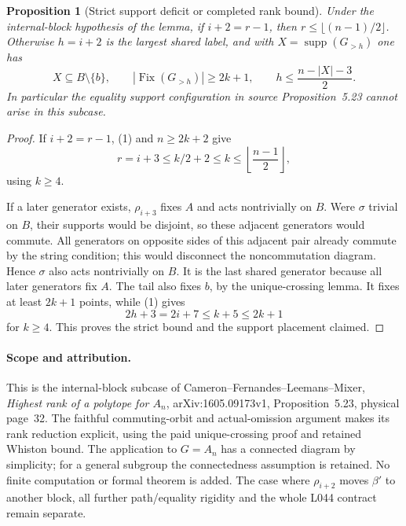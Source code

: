 \documentclass[11pt,a4paper]{article}
\newtheorem{proposition}[lemma]{Proposition}
\begin{document}
\begin{proposition}[Strict support deficit or completed rank bound]
Under the internal-block hypothesis of the lemma, if
$i+2=r-1$, then $r\leq\lfloor(n-1)/2\rfloor$.
Otherwise $h=i+2$ is the largest shared label, and with
$X=\operatorname{supp}(G_{>h})$ one has
\[
 X\subseteq B\setminus\{b\},\qquad
 |\operatorname{Fix}(G_{>h})|\geq2k+1,\qquad
 h\leq\frac{n-|X|-3}{2}.
\]
In particular the equality support configuration in source
Proposition~5.23 cannot arise in this subcase.
\end{proposition}
\begin{proof}
If $i+2=r-1$, (1) and $n\geq2k+2$ give
\[
 r=i+3\leq k/2+2\leq k\leq\left\lfloor\frac{n-1}{2}\right\rfloor,
\]
using $k\geq4$.

If a later generator exists, $\rho_{i+3}$ fixes $A$ and acts
nontrivially on $B$. Were $\sigma$ trivial on $B$, their
supports would be disjoint, so these adjacent generators
would commute. All generators on opposite sides of this
adjacent pair already commute by the string condition;
this would disconnect the noncommutation diagram. Hence
$\sigma$ also acts nontrivially on $B$. It is the last
shared generator because all later generators fix $A$.
The tail also fixes $b$, by the unique-crossing lemma.
It fixes at least $2k+1$ points, while (1) gives
\[
                        2h+3=2i+7\leq k+5\leq2k+1
\]
for $k\geq4$. This proves the strict bound and the support
placement claimed.
\end{proof}

\paragraph{Scope and attribution.}
This is the internal-block subcase of Cameron--Fernandes--Leemans--Mixer,
\emph{Highest rank of a polytope for $A_n$}, arXiv:1605.09173v1,
Proposition~5.23, physical page~32. The faithful commuting-orbit
and actual-omission argument makes its rank reduction explicit,
using the paid unique-crossing proof and retained Whiston bound.
The application to $G=A_n$ has a connected diagram by simplicity;
for a general subgroup the connectedness assumption is retained.
No finite computation or formal theorem is added. The case where
$\rho_{i+2}$ moves $\beta'$ to another block, all further
path/equality rigidity and the whole L044 contract remain separate.
\end{document}
